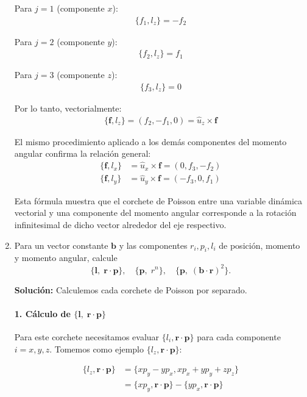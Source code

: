 \documentclass[12pt]{article}
\begin{document}
\begin{enumerate}
  Para $j=1$ (componente $x$):
  \begin{align}
  \{f_1, l_z\} = -f_2
  \end{align}

  Para $j=2$ (componente $y$):
  \begin{align}
  \{f_2, l_z\} = f_1
  \end{align}

  Para $j=3$ (componente $z$):
  \begin{align}
  \{f_3, l_z\} = 0
  \end{align}

  Por lo tanto, vectorialmente:
  \begin{align}
  \{\mathbf{f}, l_z\} = (f_2, -f_1, 0) = \hat{u}_z \times \mathbf{f}
  \end{align}

  El mismo procedimiento aplicado a los demás componentes del momento angular confirma la relación general:
  \begin{align}
  \{\mathbf{f}, l_x\} &= \hat{u}_x \times \mathbf{f} = (0, f_3, -f_2)\\
  \{\mathbf{f}, l_y\} &= \hat{u}_y \times \mathbf{f} = (-f_3, 0, f_1)
  \end{align}

  Esta fórmula muestra que el corchete de Poisson entre una variable dinámica vectorial y una componente del momento angular corresponde a la rotación infinitesimal de dicho vector alrededor del eje respectivo.

  \item Para un vector constante \(\mathbf b\) y las componentes \(r_i,p_i,l_i\) de posición, momento y momento angular, calcule
    \[
      \{\mathbf l,\;\mathbf r\cdot\mathbf p\},\quad
      \{\mathbf p,\;r^n\},\quad
      \{\mathbf p,\;(\mathbf b\cdot\mathbf r)^2\}.
    \]

  \textbf{Solución:} Calculemos cada corchete de Poisson por separado.

  \paragraph{1. Cálculo de $\{\mathbf l,\;\mathbf r\cdot\mathbf p\}$}

  Para este corchete necesitamos evaluar $\{l_i, \mathbf{r}\cdot\mathbf{p}\}$ para cada componente $i=x,y,z$. Tomemos como ejemplo $\{l_z, \mathbf{r}\cdot\mathbf{p}\}$:

  \begin{align}
  \{l_z, \mathbf{r}\cdot\mathbf{p}\} &= \{xp_y - yp_x, xp_x + yp_y + zp_z\} \\
  &= \{xp_y, \mathbf{r}\cdot\mathbf{p}\} - \{yp_x, \mathbf{r}\cdot\mathbf{p}\}
  \end{align}


\end{enumerate}
\end{document}

